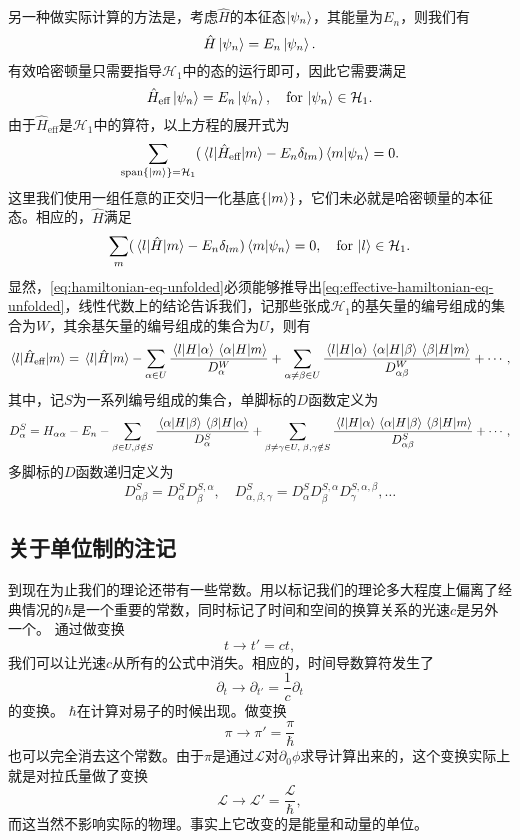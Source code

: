 \documentclass[UTF8, a4paper]{ctexart}
\begin{document}
另一种做实际计算的方法是，考虑$\hat{H}$的本征态$\ket{\psi_n}$，其能量为$E_n$，则我们有
\[
    \hat{H} \ket{\psi_n} = E_n \ket{\psi_n}.
\]
有效哈密顿量只需要指导$\mathcal{H}_1$中的态的运行即可，因此它需要满足
\[
    \hat{H}_\text{eff} \ket{\psi_n} = E_n \ket{\psi_n}, \quad \text{for $\ket{\psi_n} \in \mathcal{H}_1$}.
\]
由于$\hat{H}_\text{eff}$是$\mathcal{H}_1$中的算符，以上方程的展开式为
\begin{equation}
    \sum_{\text{span}\{\ket{m}\} = \mathcal{H}_1} (\mel{l}{\hat{H}_\text{eff}}{m} - E_n \delta_{lm}) \braket{m}{\psi_n} = 0.
    \label{eq:effective-hamiltonian-eq-unfolded}
\end{equation}
这里我们使用一组任意的正交归一化基底$\{\ket{m}\}$，它们未必就是哈密顿量的本征态。相应的，$\hat{H}$满足
\begin{equation}
    \sum_m (\mel{l}{\hat{H}}{m} - E_n \delta_{lm}) \braket{m}{\psi_n} = 0, \quad \text{for $\ket{l} \in \mathcal{H}_1$}.
    \label{eq:hamiltonian-eq-unfolded}
\end{equation}
显然，\eqref{eq:hamiltonian-eq-unfolded}必须能够推导出\eqref{eq:effective-hamiltonian-eq-unfolded}，线性代数上的结论告诉我们，记那些张成$\mathcal{H}_1$的基矢量的编号组成的集合为$W$，其余基矢量的编号组成的集合为$U$，则有
\[
    \mel{l}{\hat{H}_\text{eff}}{m} = \mel{l}{\hat{H}}{m} - \sum_{\alpha \in U} \frac{\mel{l}{H}{\alpha} \mel{\alpha}{H}{m}} {D_\alpha^W} + \sum_{\alpha \neq \beta \in U} \frac{\mel{l}{H}{\alpha} \mel{\alpha}{H}{\beta} \mel{\beta}{H}{m}}{D^W_{\alpha \beta}} + \cdots,
\]
其中，记$S$为一系列编号组成的集合，单脚标的$D$函数定义为
\[
    D_\alpha^S = H_{\alpha \alpha} - E_n - \sum_{\beta \in U, \beta \notin S} \frac{\mel{\alpha}{H}{\beta} \mel{\beta}{H}{\alpha}}{D_\alpha^S} + \sum_{\beta \neq \gamma \in U, \; \beta, \gamma \notin S} \frac{\mel{l}{H}{\alpha} \mel{\alpha}{H}{\beta} \mel{\beta}{H}{m}}{D_{\alpha \beta}^S} + \cdots,
\]
多脚标的$D$函数递归定义为
\[
    D_{\alpha \beta}^S = D_\alpha^S D_{\beta}^{S, \alpha}, \quad D_{\alpha, \beta, \gamma}^S = D_{\alpha}^S D_{\beta}^{S, \alpha} D_{\gamma}^{S, \alpha, \beta}, \ldots
\]

\subsection{关于单位制的注记}

到现在为止我们的理论还带有一些常数。用以标记我们的理论多大程度上偏离了经典情况的$\hbar$是一个重要的常数，同时标记了时间和空间的换算关系的光速$c$是另外一个。
通过做变换
\[
    t \longrightarrow t' = ct,
\]
我们可以让光速$c$从所有的公式中消失。相应的，时间导数算符发生了
\[
    \partial_t \longrightarrow \partial_{t'} = \frac{1}{c} \partial_t
\]
的变换。
$\hbar$在计算对易子的时候出现。做变换
\[
    \pi \longrightarrow \pi' = \frac{\pi}{\hbar}
\]
也可以完全消去这个常数。由于$\pi$是通过$\mathcal{L}$对$\partial_0 \phi$求导计算出来的，这个变换实际上就是对拉氏量做了变换
\[
    \mathcal{L} \longrightarrow \mathcal{L}' = \frac{\mathcal{L}}{\hbar},
\]
而这当然不影响实际的物理。事实上它改变的是能量和动量的单位。
\end{document}
